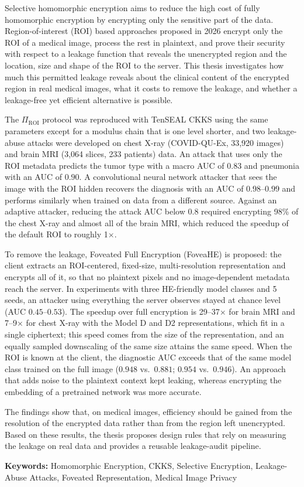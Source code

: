 Selective homomorphic encryption aims to reduce the high cost of fully homomorphic encryption by encrypting only the sensitive part of the data. Region-of-interest (ROI) based approaches proposed in 2026 encrypt only the ROI of a medical image, process the rest in plaintext, and prove their security with respect to a leakage function that reveals the unencrypted region and the location, size and shape of the ROI to the server. This thesis investigates how much this permitted leakage reveals about the clinical content of the encrypted region in real medical images, what it costs to remove the leakage, and whether a leakage-free yet efficient alternative is possible.

The $\Pi_{\mathrm{ROI}}$ protocol was reproduced with TenSEAL CKKS using the same parameters except for a modulus chain that is one level shorter, and two leakage-abuse attacks were developed on chest X-ray (COVID-QU-Ex, 33,920 images) and brain MRI (3,064 slices, 233 patients) data. An attack that uses only the ROI metadata predicts the tumor type with a macro AUC of $0.83$ and pneumonia with an AUC of $0.90$. A convolutional neural network attacker that sees the image with the ROI hidden recovers the diagnosis with an AUC of $0.98$--$0.99$ and performs similarly when trained on data from a different source. Against an adaptive attacker, reducing the attack AUC below $0.8$ required encrypting 98\% of the chest X-ray and almost all of the brain MRI, which reduced the speedup of the default ROI to roughly 1$\times$.

To remove the leakage, Foveated Full Encryption (FoveaHE) is proposed: the client extracts an ROI-centered, fixed-size, multi-resolution representation and encrypts all of it, so that no plaintext pixels and no image-dependent metadata reach the server. In experiments with three HE-friendly model classes and 5 seeds, an attacker using everything the server observes stayed at chance level (AUC $0.45$--$0.53$). The speedup over full encryption is 29--37$\times$ for brain MRI and 7--9$\times$ for chest X-ray with the Model D and D2 representations, which fit in a single ciphertext; this speed comes from the size of the representation, and an equally sampled downscaling of the same size attains the same speed. When the ROI is known at the client, the diagnostic AUC exceeds that of the same model class trained on the full image ($0.948$ vs.\ $0.881$; $0.954$ vs.\ $0.946$). An approach that adds noise to the plaintext context kept leaking, whereas encrypting the embedding of a pretrained network was more accurate.

The findings show that, on medical images, efficiency should be gained from the resolution of the encrypted data rather than from the region left unencrypted. Based on these results, the thesis proposes design rules that rely on measuring the leakage on real data and provides a reusable leakage-audit pipeline.

\textbf{Keywords:} Homomorphic Encryption, CKKS, Selective Encryption, Leakage-Abuse Attacks, Foveated Representation, Medical Image Privacy
